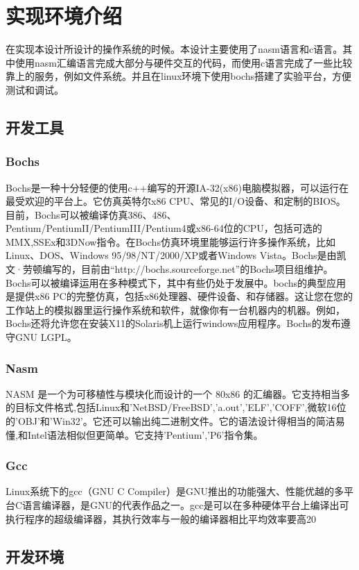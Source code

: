 \documentclass[UTF8,nofonts,cs4size]{ctexrep}
\begin{document}
\section{实现环境介绍}
在实现本设计所设计的操作系统的时候。本设计主要使用了nasm语言和c语言。其中使用nasm汇编语言完成大部分与硬件交互的代码，而使用c语言完成了一些比较靠上的服务，例如文件系统。并且在linux环境下使用bochs搭建了实验平台，方便测试和调试。
\subsection{开发工具}
\subsubsection{Bochs}
Bochs是一种十分轻便的使用c++编写的开源IA-32(x86)电脑模拟器，可以运行在最受欢迎的平台上。它仿真英特尔x86 CPU、常见的I/O设备、和定制的BIOS。目前，Bochs可以被编译仿真386、486、Pentium/PentiumII/PentiumIII/Pentium4或x86-64位的CPU，包括可选的MMX,SSEx和3DNow指令。在Bochs仿真环境里能够运行许多操作系统，比如Linux、DOS、Windows 95/98/NT/2000/XP或者Windows Vista。Bochs是由凯文·劳顿编写的，目前由“http://bochs.sourceforge.net”的Bochs项目组维护。Bochs可以被编译运用在多种模式下，其中有些仍处于发展中。bochs的典型应用是提供x86 PC的完整仿真，包括x86处理器、硬件设备、和存储器。这让您在您的工作站上的模拟器里运行操作系统和软件，就像你有一台机器内的机器。例如，Bochs还将允许您在安装X11的Solaris机上运行windows应用程序。Bochs的发布遵守GNU LGPL。
\subsubsection{Nasm}
NASM 是一个为可移植性与模块化而设计的一个 80x86 的汇编器。它支持相当多的目标文件格式,包括Linux和'NetBSD/FreeBSD','a.out','ELF','COFF',微软16位的'OBJ'和'Win32'。它还可以输出纯二进制文件。它的语法设计得相当的简洁易懂,和Intel语法相似但更简单。它支持'Pentium','P6'指令集。
\subsubsection{Gcc}
Linux系统下的gcc（GNU C Compiler）是GNU推出的功能强大、性能优越的多平台C语言编译器，是GNU的代表作品之一。gcc是可以在多种硬体平台上编译出可执行程序的超级编译器，其执行效率与一般的编译器相比平均效率要高20%
\subsection{开发环境}
\end{document}

